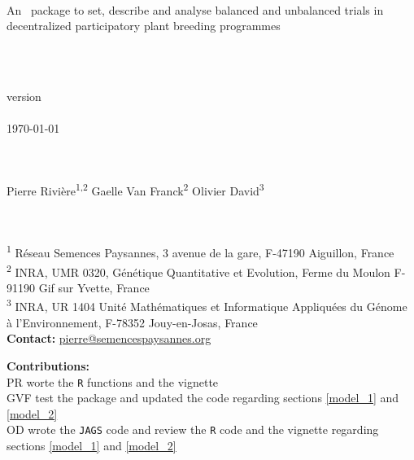 \pagestyle{empty}
\begin{center}
\Huge{\pack } \\
\Large{An \R~package to set, describe and analyse balanced and unbalanced trials in decentralized participatory plant breeding programmes}

~\\


~\\

version \versionnumber \\

~\\
\today

~\\~\\

Pierre Rivi\`ere\textsuperscript{1,2} \hspace{1cm} 
Gaelle Van Franck\textsuperscript{2} \hspace{1cm}
Olivier David\textsuperscript{3} \\
~\\~\\ 
\end{center}

\vfill

\noindent\textsuperscript{1} R\'eseau Semences Paysannes, 3 avenue de la gare, F-47190 Aiguillon, France \\
\textsuperscript{2} INRA, UMR 0320, Génétique Quantitative et Evolution, Ferme du Moulon F-91190 Gif sur Yvette, France \\
\textsuperscript{3} INRA, UR 1404 Unité Mathématiques et Informatique Appliquées du Génome à l'Environnement, F-78352 Jouy-en-Josas, France \\ 
\textbf{Contact:} \href{mailto:pierre@semencespaysannes.org}{pierre@semencespaysannes.org} \\

\vfill

\noindent\textbf{Contributions:} \\
PR worte the \texttt{R} functions and the vignette \\
GVF test the package and updated the code regarding sections \ref{model_1} and \ref{model_2} \\
OD wrote the \texttt{JAGS} code and review the \texttt{R} code and the vignette regarding sections \ref{model_1} and \ref{model_2} \\

